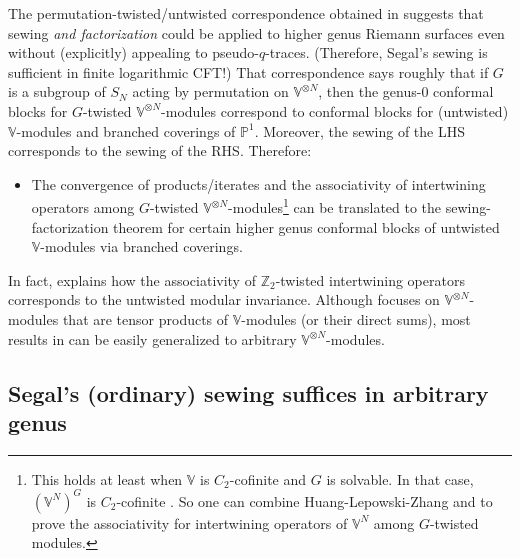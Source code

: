 \documentclass[11pt,b5paper,notitlepage]{article}
\theoremstyle{definition}
\theoremstyle{plain}
\newcommand{\Vbb}{\mathbb V}
\newcommand{\Zbb}{\mathbb Z}
\newcommand{\Pbb}{\mathbb P}
\newcommand{\<}{\left\langle}
\renewcommand{\>}{\right\rangle}
\numberwithin{equation}{subsection}
\begin{document}
The permutation-twisted/untwisted correspondence obtained in \cite{Gui-permutation} suggests that sewing \textit{and factorization} could be applied to higher genus Riemann surfaces even without (explicitly) appealing to pseudo-$q$-traces. (Therefore, Segal's sewing is sufficient in finite logarithmic CFT!) That correspondence says roughly that if $G$ is a subgroup of $S_N$ acting by permutation on $\Vbb^{\otimes N}$, then the genus-$0$ conformal blocks for $G$-twisted  $\Vbb^{\otimes N}$-modules correspond to conformal blocks for (untwisted) $\Vbb$-modules and branched coverings of $\Pbb^1$. Moreover, the sewing of the LHS corresponds to the sewing of the RHS. Therefore:
\begin{itemize}
\item The convergence of products/iterates and the associativity of intertwining operators among  $G$-twisted $\Vbb^{\otimes N}$-modules\footnote{This holds at least when $\Vbb$ is $C_2$-cofinite and $G$ is solvable. In that case, $(\Vbb^N)^G$ is $C_2$-cofinite \cite{Miy-C2-orbifold}. So one can combine Huang-Lepowski-Zhang and \cite{McR-equiv} to prove the associativity for intertwining operators of $\Vbb^N$ among $G$-twisted modules. } can be translated to the sewing-factorization theorem for certain higher genus conformal blocks of untwisted $\Vbb$-modules via branched coverings.
\end{itemize}
In fact, \cite[Sec. 0.2]{Gui-permutation} explains how the associativity of $\Zbb_2$-twisted intertwining operators corresponds to the untwisted modular invariance. Although \cite{Gui-permutation} focuses on $\Vbb^{\otimes N}$-modules that are tensor products of $\Vbb$-modules (or their direct sums), most results in \cite{Gui-permutation} can be easily generalized to arbitrary $\Vbb^{\otimes N}$-modules.


\subsection{Segal's (ordinary) sewing suffices in arbitrary genus}\label{lbb65}
\end{document}
